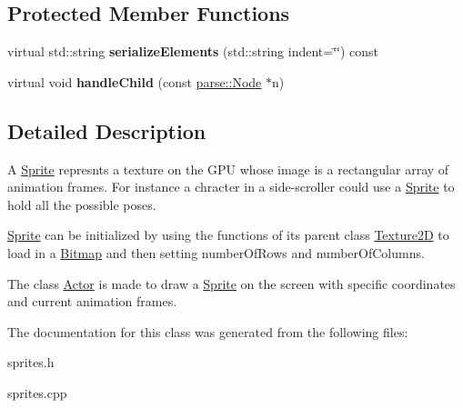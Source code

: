 \subsection*{Protected Member Functions}
\begin{DoxyCompactItemize}
\item 
\hypertarget{classg2c_1_1_sprite_a31e0617f286d70f61664218767e7a963}{
virtual std::string {\bfseries serializeElements} (std::string indent=\char`\"{}\char`\"{}) const }
\label{classg2c_1_1_sprite_a31e0617f286d70f61664218767e7a963}

\item 
\hypertarget{classg2c_1_1_sprite_ae53a67afb41347fd05de1688b9a005f5}{
virtual void {\bfseries handleChild} (const \hyperlink{classparse_1_1_node}{parse::Node} $\ast$n)}
\label{classg2c_1_1_sprite_ae53a67afb41347fd05de1688b9a005f5}

\end{DoxyCompactItemize}


\subsection{Detailed Description}
A \hyperlink{classg2c_1_1_sprite}{Sprite} represnts a texture on the GPU whose image is a rectangular array of animation frames. For instance a chracter in a side-\/scroller could use a \hyperlink{classg2c_1_1_sprite}{Sprite} to hold all the possible poses.

\hyperlink{classg2c_1_1_sprite}{Sprite} can be initialized by using the functions of its parent class \hyperlink{classg2c_1_1_texture2_d}{Texture2D} to load in a \hyperlink{classg2c_1_1_bitmap}{Bitmap} and then setting numberOfRows and numberOfColumns.

The class \hyperlink{classg2c_1_1_actor}{Actor} is made to draw a \hyperlink{classg2c_1_1_sprite}{Sprite} on the screen with specific coordinates and current animation frames. 

The documentation for this class was generated from the following files:\begin{DoxyCompactItemize}
\item 
sprites.h\item 
sprites.cpp\end{DoxyCompactItemize}

